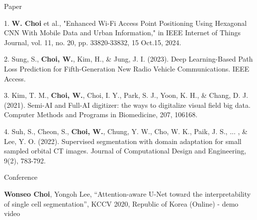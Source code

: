\documentclass[
	11pt, %
]{resume} %
\begin{document}
\begin{rSection}{Paper}

	1. \textbf{W. Choi} et al., "Enhanced Wi-Fi Access Point Positioning Using Hexagonal CNN With Mobile Data and Urban Information," in IEEE Internet of Things Journal, vol. 11, no. 20, pp. 33820-33832, 15 Oct.15, 2024.

	2. Sung, S., \textbf{Choi, W.}, Kim, H., \& Jung, J. I. (2023). Deep Learning-Based Path Loss Prediction for Fifth-Generation New Radio Vehicle Communications. IEEE Access.
	
	3. Kim, T. M., \textbf{Choi, W.}, Choi, I. Y., Park, S. J., Yoon, K. H., \& Chang, D. J. (2021). Semi-AI and Full-AI digitizer: the ways to digitalize visual field big data. Computer Methods and Programs in Biomedicine, 207, 106168.

	4. Suh, S., Cheon, S., \textbf{Choi, W.}, Chung, Y. W., Cho, W. K., Paik, J. S., ... , \& Lee, Y. O. (2022). Supervised segmentation with domain adaptation for small sampled orbital CT images. Journal of Computational Design and Engineering, 9(2), 783-792.


\end{rSection}

\begin{rSection}{Conference}
	
	\textbf{Wonseo Choi}, Yongoh Lee, “Attention-aware U-Net toward the interpretability of single cell segmentation”, KCCV 2020, Republic of Korea (Online) - demo video

\end{rSection}

	


\end{document}
